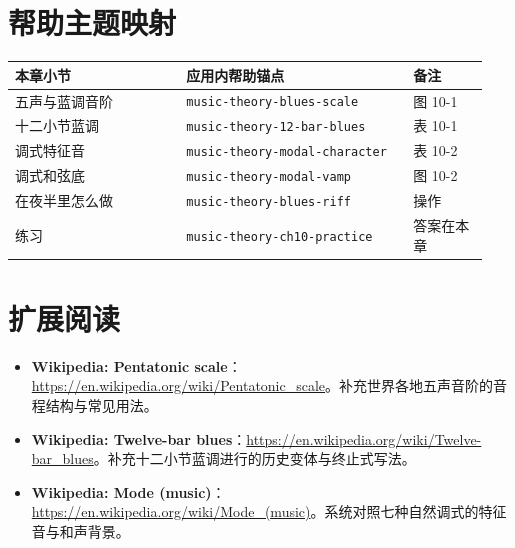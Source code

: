\section{帮助主题映射}
\begin{center}
\footnotesize
\setlength{\tabcolsep}{3pt}
\begin{longtable}{p{0.34\linewidth}p{0.45\linewidth}p{0.15\linewidth}}
\toprule
本章小节 & 应用内帮助锚点 & 备注 \\
\midrule
\endhead
五声与蓝调音阶 & \texttt{music-theory-blues-scale} & 图 10-1 \\
十二小节蓝调 & \texttt{music-theory-12-bar-blues} & 表 10-1 \\
调式特征音 & \texttt{music-theory-modal-character} & 表 10-2 \\
调式和弦底 & \texttt{music-theory-modal-vamp} & 图 10-2 \\
在夜半里怎么做 & \texttt{music-theory-blues-riff} & 操作 \\
练习 & \texttt{music-theory-ch10-practice} & 答案在本章 \\
\bottomrule
\end{longtable}
\end{center}

\section*{扩展阅读}
\begin{itemize}
  \item \textbf{Wikipedia: Pentatonic scale}：\url{https://en.wikipedia.org/wiki/Pentatonic_scale}。补充世界各地五声音阶的音程结构与常见用法。
  \item \textbf{Wikipedia: Twelve-bar blues}：\url{https://en.wikipedia.org/wiki/Twelve-bar_blues}。补充十二小节蓝调进行的历史变体与终止式写法。
  \item \textbf{Wikipedia: Mode (music)}：\url{https://en.wikipedia.org/wiki/Mode_(music)}。系统对照七种自然调式的特征音与和声背景。
\end{itemize}

